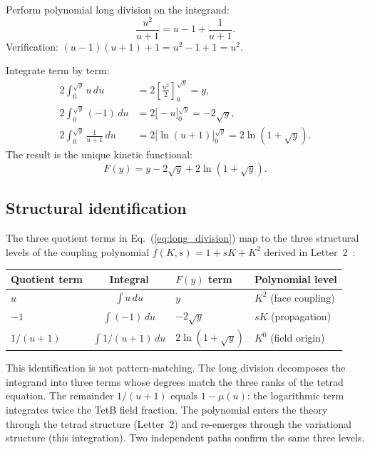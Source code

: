 \documentclass[11pt]{article}
\begin{document}
Perform polynomial long division on the integrand:
\begin{equation}
  \frac{u^2}{u + 1} = u - 1 + \frac{1}{u + 1}.
  \label{eq:long_division}
\end{equation}
Verification: $(u - 1)(u + 1) + 1 = u^2 - 1 + 1 = u^2$.
\checkmark

Integrate term by term:
\begin{align}
  2\int_0^{\sqrt{y}} u\,du
    &= 2\left[\tfrac{u^2}{2}\right]_0^{\sqrt{y}}
    = y,
    \label{eq:term_K2} \\[4pt]
  2\int_0^{\sqrt{y}} (-1)\,du
    &= 2\bigl[-u\bigr]_0^{\sqrt{y}}
    = -2\sqrt{y},
    \label{eq:term_sK} \\[4pt]
  2\int_0^{\sqrt{y}} \frac{1}{u+1}\,du
    &= 2\bigl[\ln(u+1)\bigr]_0^{\sqrt{y}}
    = 2\ln(1 + \sqrt{y}).
    \label{eq:term_K0}
\end{align}
The result is the unique kinetic functional:
\begin{equation}
  \boxed{F(y) = y - 2\sqrt{y} + 2\ln(1 + \sqrt{y}).}
  \label{eq:F}
\end{equation}

\subsection*{Structural identification}

The three quotient terms in Eq.~(\ref{eq:long_division})
map to the three structural levels of the coupling
polynomial $f(K,s) = 1 + sK + K^2$
derived in Letter~2~\cite{Nelson2026b}:

\begin{center}
\renewcommand{\arraystretch}{1.3}
\begin{tabular}{lcll}
\hline
Quotient term & Integral & $F(y)$ term & Polynomial level \\
\hline
$u$ & $\int u\,du$ & $y$ & $K^2$ (face coupling) \\
$-1$ & $\int(-1)\,du$ & $-2\sqrt{y}$
  & $sK$ (propagation) \\
$1/(u{+}1)$ & $\int 1/(u{+}1)\,du$
  & $2\ln(1{+}\sqrt{y})$ & $K^0$ (field origin) \\
\hline
\end{tabular}
\end{center}

This identification is not pattern-matching.  The long
division decomposes the integrand into three terms whose
degrees match the three ranks of the tetrad equation.
The remainder $1/(u+1)$ equals $1 - \mu(u)$: the
logarithmic term integrates twice the TetB field fraction.
The polynomial enters the theory through the tetrad
structure (Letter~2) and re-emerges through the
variational structure (this integration).  Two independent
paths confirm the same three levels.
\end{document}
